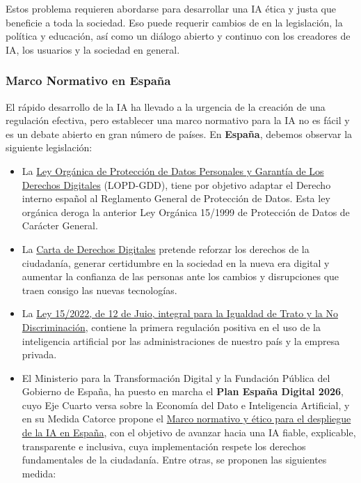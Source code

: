 Estos problema requieren abordarse para desarrollar una IA ética y justa que beneficie a toda la sociedad. Eso puede requerir cambios de en la legislación, la política y educación, así como un diálogo abierto y continuo con los creadores de IA, los usuarios y la sociedad en general.

\subsubsection{Marco Normativo en España}
El rápido desarrollo de la IA ha llevado a la urgencia de la creación de una regulación efectiva, pero establecer una marco normativo para la IA no es fácil y es un debate abierto en gran número de países. En \textbf{España}, debemos observar la siguiente legislación:

\begin{itemize}
	\item La \href{https://www.boe.es/buscar/act.php?id=BOE-A-2018-16673}{Ley Orgánica de Protección de Datos Personales y Garantía de Los Derechos Digitales} (LOPD-GDD), tiene por objetivo adaptar el Derecho interno español al Reglamento General de Protección de Datos. Esta ley orgánica deroga la anterior Ley Orgánica 15/1999 de Protección de Datos de Carácter General.
	
	\item La \href{https://www.lamoncloa.gob.es/presidente/actividades/Documents/2021/140721-Carta_Derechos_Digitales_RedEs.pdf}{Carta de Derechos Digitales} pretende reforzar los derechos de la ciudadanía, generar certidumbre en la sociedad en la nueva era digital y aumentar la confianza de las personas ante los cambios y disrupciones que traen consigo las nuevas tecnologías. 
	
	\item La \href{https://www.boe.es/buscar/act.php?id=BOE-A-2022-11589}{Ley 15/2022, de 12 de Juio, integral para la Igualdad de Trato y la No Discriminación}, contiene la primera regulación positiva en el uso de la inteligencia artificial por las administraciones de nuestro país y la empresa privada. 
	
	\item El Ministerio para la Transformación Digital y la Fundación Pública del Gobierno de España, ha puesto en marcha el \textbf{Plan España Digital 2026}, cuyo Eje Cuarto versa sobre la Economía del Dato e Inteligencia Artificial, y en su Medida Catorce propone el \href{https://espanadigital.gob.es/medida/marco-normativo-y-etico-para-el-despliegue-de-la-ia}{Marco normativo y ético para el despliegue de la IA en España}, con el objetivo de avanzar hacia una IA fiable, explicable, transparente e inclusiva, cuya implementación respete los derechos fundamentales de la ciudadanía. Entre otras, se proponen las siguientes medida:
	

\end{itemize}
